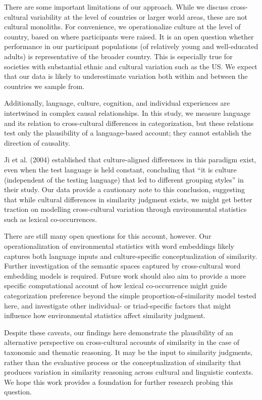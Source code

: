 \documentclass[10pt, letterpaper]{article}
\begin{document}
There are some important limitations of our approach. While we discuss
cross-cultural variability at the level of countries or larger world
areas, these are not cultural monoliths. For convenience, we
operationalize culture at the level of country, based on where
participants were raised. It is an open question whether performance in
our participant populations (of relatively young and well-educated
adults) is representative of the broader country. This is especially
true for societies with substantial ethnic and cultural variation such
as the US. We expect that our data is likely to underestimate variation
both within and between the countries we sample from.

Additionally, language, culture, cognition, and individual experiences
are intertwined in complex causal relationships. In this study, we
measure language and its relation to cross-cultural differences in
categorization, but these relations test only the plausibility of a
language-based account; they cannot establish the direction of
causality.

Ji et al. (2004) established that culture-aligned differences in this
paradigm exist, even when the test language is held constant, concluding
that ``it is culture (independent of the testing language) that led to
different grouping styles'' in their study. Our data provide a
cautionary note to this conclusion, suggesting that while cultural
differences in similarity judgment exists, we might get better traction
on modelling cross-cultural variation through environmental statistics
such as lexical co-occurrences.

There are still many open questions for this account, however. Our
operationalization of environmental statistics with word embeddings
likely captures both language inputs and culture-specific
conceptualization of similarity. Further investigation of the semantic
spaces captured by cross-cultural word embedding models is required.
Future work should also aim to provide a more specific computational
account of how lexical co-occurrence might guide categorization
preference beyond the simple proportion-of-similarity model tested here,
and investigate other individual- or triad-specific factors that might
influence how environmental statistics affect similarity judgment.

Despite these caveats, our findings here demonstrate the plausibility of
an alternative perspective on cross-cultural accounts of similarity in
the case of taxonomic and thematic reasoning. It may be the input to
similarity judgments, rather than the evaluative process or the
conceptualization of similarity that produces variation in similarity
reasoning across cultural and linguistic contexts. We hope this work
provides a foundation for further research probing this question.
\end{document}
